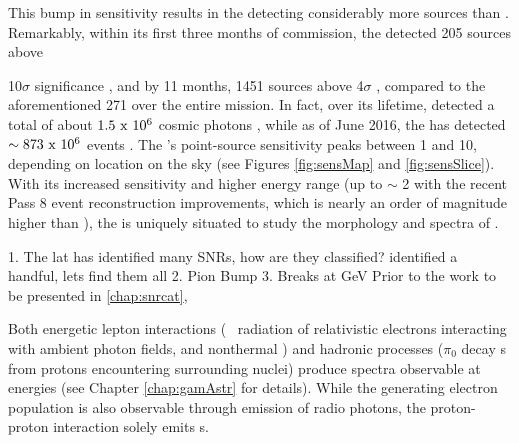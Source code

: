 This bump in sensitivity results in the \lat{} detecting considerably more sources than \egret{}. Remarkably, within its first three months of commission, the \lat{} detected 205 sources above {\rm 10$\sigma$ significance \citep{lat_3m}, and by 11 months, 1451 sources above 4$\sigma$ \citep{1FGL}, compared to  the aforementioned 271 over the entire \egret{} mission. In fact, over its lifetime, \egret{} detected a total of about ${\rm 1.5~x~10^6}$ cosmic photons \citep{Thomson93}, while as of June 2016, the \lat{} has detected ${\rm \sim 873~x~10^6}$ events . The \lat{}'s point-source sensitivity peaks between 1 and 10\gev{}, depending on location on the sky (see Figures \ref{fig:sensMap} and \ref{fig:sensSlice}). With its increased sensitivity and higher energy range (up to $\sim$ 2\tev{} with the recent Pass 8 event reconstruction improvements, which is nearly an order of magnitude higher than \egret{}), the \lat{} is uniquely situated to study the \gam{} morphology and spectra of \snrs{}. 
	
1. The lat has identified many SNRs, how are they classified? identified a handful, lets find them all
2. Pion Bump
3. Breaks at GeV
Prior to the work to be presented in \ref{chap:snrcat}, 

 



Both energetic lepton interactions (\ie{}\ \ic{} radiation of relativistic electrons interacting with ambient photon fields, and nonthermal \brems{}) and hadronic processes ($\pi_0$ decay \gam{}s from \cray{} protons encountering surrounding nuclei) produce spectra observable at \gam{} energies (see Chapter \ref{chap:gamAstr} for details). While the \ic{} generating electron population is also observable through emission of radio \sync{} photons, the proton-proton interaction solely emits \gam{}s.  

}
